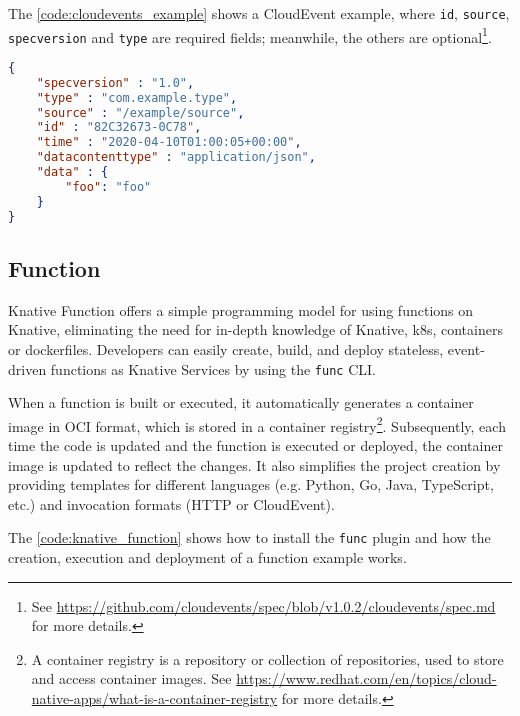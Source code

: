 \documentclass[../thesis.tex]{subfiles}
\begin{document}
The \autoref{code:cloudevents_example} shows a CloudEvent example, where \texttt{id}, \texttt{source}, \texttt{specversion} and \texttt{type} are required fields; meanwhile, the others are optional\footnote{See \href{https://github.com/cloudevents/spec/blob/v1.0.2/cloudevents/spec.md}{https://github.com/cloudevents/spec/blob/v1.0.2/cloudevents/spec.md} for more details.}.

\begin{lstlisting}[language=json, captionpos=b, caption={[CloudEvent example in JSON format]Example of a CloudEvent in JSON format, with all necessary fields and the payload, defined by the \texttt{data} object.}, label={code:cloudevents_example}]
{
    "specversion" : "1.0",
    "type" : "com.example.type",
    "source" : "/example/source",
    "id" : "82C32673-0C78",
    "time" : "2020-04-10T01:00:05+00:00",
    "datacontenttype" : "application/json",
    "data" : {
        "foo": "foo"
    }
}
\end{lstlisting}

\subsection{Function}
Knative Function offers a simple programming model for using functions on Knative, eliminating the need for in-depth knowledge of Knative, \gls{k8s}, \gls{container}s or \gls{dockerfile}s. Developers can easily create, build, and deploy stateless, event-driven functions as Knative Services by using the \texttt{func} \cite{site:knative_cli_tools} \acrshort{CLI}.

When a function is built or executed, it automatically generates a \gls{container} image in \acrfull{OCI} \cite{site:oci_image} format, which is stored in a container registry\footnote{A container registry is a repository or collection of repositories, used to store and access container images. See \href{https://www.redhat.com/en/topics/cloud-native-apps/what-is-a-container-registry}{https://www.redhat.com/en/topics/cloud-native-apps/what-is-a-container-registry} for more details.}. Subsequently, each time the code is updated and the function is executed or deployed, the \gls{container} image is updated to reflect the changes. It also simplifies the project creation by providing templates for different languages (e.g. Python, Go, Java, TypeScript, etc.) and invocation formats (\acrshort{HTTP} or CloudEvent).

The \autoref{code:knative_function} shows how to install the \texttt{func} plugin and how the creation, execution and deployment of a function example works.
\end{document}
